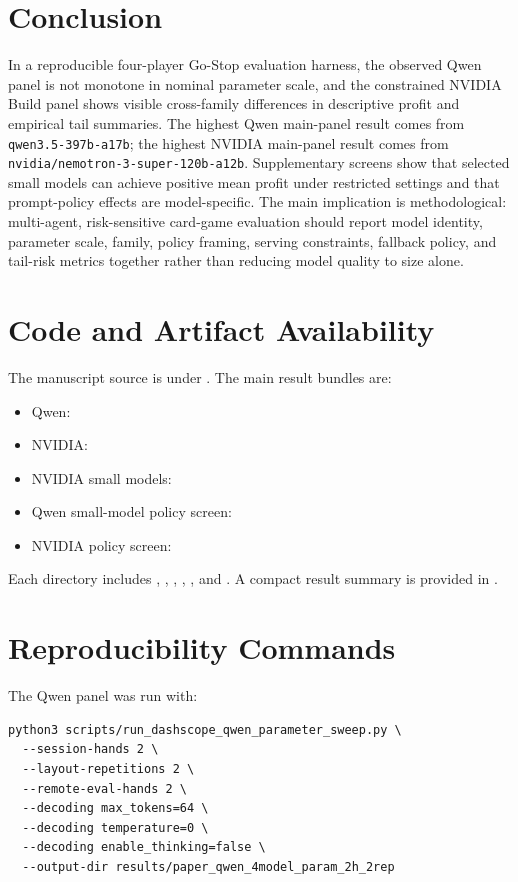 \documentclass[11pt]{article}
\begin{document}
\section{Conclusion}
In a reproducible four-player Go-Stop evaluation harness, the observed Qwen panel is not monotone in nominal parameter scale, and the constrained NVIDIA Build panel shows visible cross-family differences in descriptive profit and empirical tail summaries. The highest Qwen main-panel result comes from \texttt{qwen3.5-397b-a17b}; the highest NVIDIA main-panel result comes from \texttt{nvidia/nemotron-3-super-120b-a12b}. Supplementary screens show that selected small models can achieve positive mean profit under restricted settings and that prompt-policy effects are model-specific. The main implication is methodological: multi-agent, risk-sensitive card-game evaluation should report model identity, parameter scale, family, policy framing, serving constraints, fallback policy, and tail-risk metrics together rather than reducing model quality to size alone.

\section*{Code and Artifact Availability}
The manuscript source is under . The main result bundles are:
\begin{itemize}
    \item Qwen: 
    \item NVIDIA: 
    \item NVIDIA small models: 
    \item Qwen small-model policy screen: 
    \item NVIDIA policy screen: 
\end{itemize}
Each directory includes , , , , , and . A compact result summary is provided in .




\appendix
\section{Reproducibility Commands}
The Qwen panel was run with:
\begin{verbatim}
python3 scripts/run_dashscope_qwen_parameter_sweep.py \
  --session-hands 2 \
  --layout-repetitions 2 \
  --remote-eval-hands 2 \
  --decoding max_tokens=64 \
  --decoding temperature=0 \
  --decoding enable_thinking=false \
  --output-dir results/paper_qwen_4model_param_2h_2rep
\end{verbatim}
\end{document}
